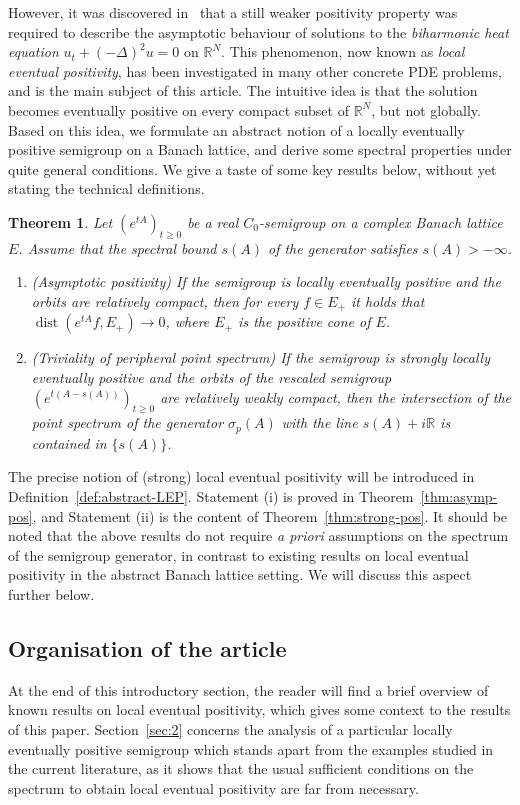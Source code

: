 \documentclass[sn-mathphys]{sn-jnl}%
\theoremstyle{thmstyleone}
\newtheorem{theorem}{Theorem}[section]
\theoremstyle{thmstylethree}
\DeclareMathOperator{\dist}{dist}
\newcommand{\RR}{\mathbb{R}}
\begin{document}
However, it was discovered in~\cite{GG-lep} that a still weaker positivity property was required to describe the asymptotic behaviour of solutions to the \emph{biharmonic heat equation} $u_t + (-\Delta)^2 u=0$ on $\RR^N$. This phenomenon, now known as \emph{local eventual positivity}, has been investigated in many other concrete PDE problems, and is the main subject of this article. The intuitive idea is that the solution becomes eventually positive on every compact subset of $\RR^N$, but not globally. Based on this idea, we formulate an abstract notion of a locally eventually positive semigroup on a Banach lattice, and derive some spectral properties under quite general conditions. We give a taste of some key results below, without yet stating the technical definitions.
\begin{theorem}
	\label{thm:LEP-intro}
	Let $(e^{tA})_{t\ge 0}$ be a real $C_0$-semigroup on a complex Banach lattice $E$. Assume that the spectral bound $s(A)$ of the generator satisfies $s(A)>-\infty$.
	\begin{enumerate}[\upshape(i)]
		\item \emph{(Asymptotic positivity)} If the semigroup is locally eventually positive and the orbits are relatively compact, then for every $f\in E_+$ it holds that $\dist(e^{tA}f, E_+) \to 0$, where $E_+$ is the positive cone of $E$.
		\item \emph{(Triviality of peripheral point spectrum)} If the semigroup is strongly locally eventually positive and the orbits of the rescaled semigroup $(e^{t(A-s(A))})_{t\ge 0}$ are relatively weakly compact, then the intersection of the point spectrum of the generator $\sigma_p(A)$ with the line $s(A)+i\RR$ is contained in $\{s(A)\}$.
	\end{enumerate}
\end{theorem}
The precise notion of (strong) local eventual positivity will be introduced in Definition~\ref{def:abstract-LEP}. Statement (i) is proved in Theorem~\ref{thm:asymp-pos}, and Statement (ii) is the content of Theorem~\ref{thm:strong-pos}. It should be noted that the above results do not require \emph{a priori} assumptions on the spectrum of the semigroup generator, in contrast to existing results on local eventual positivity in the abstract Banach lattice setting. We will discuss this aspect further below.

\subsection*{Organisation of the article}
At the end of this introductory section, the reader will find a brief overview of known results on local eventual positivity, which gives some context to the results of this paper. Section~\ref{sec:2} concerns the analysis of a particular locally eventually positive semigroup which stands apart from the examples studied in the current literature, as it shows that the usual sufficient conditions on the spectrum to obtain local eventual positivity are far from necessary.
\end{document}
